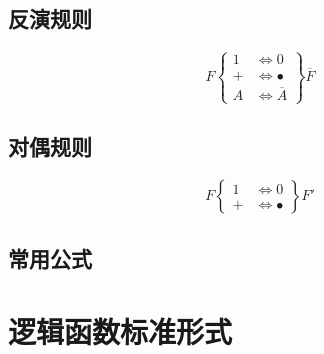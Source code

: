 \subsection{反演规则}

\begin{equation}
    F\left\{
    \begin{aligned}
        1 & \Longleftrightarrow 0           \\
        + & \Longleftrightarrow \bullet     \\
        A & \Longleftrightarrow \overline A
    \end{aligned}
    \right\}\overline F
\end{equation}

\subsection{对偶规则}

\begin{equation}
    F\left\{
    \begin{aligned}
        1 & \Longleftrightarrow 0       \\
        + & \Longleftrightarrow \bullet
    \end{aligned}
    \right\} F'
\end{equation}

\subsection{常用公式}

\newpage

\section{逻辑函数标准形式}

